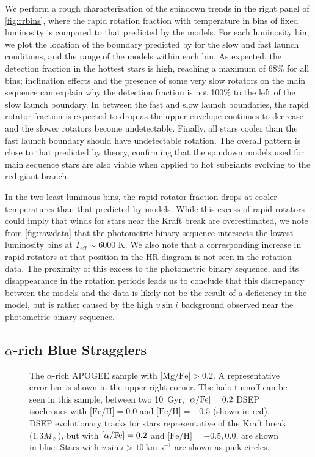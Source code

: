 \documentclass[preprint2]{aastex62}
\newcommand{\vsini}{\ensuremath{v \sin i}}
\newcommand{\Teff}{\ensuremath{T_{\textrm{eff}}}}
\newcommand{\kms}{\textrm{km~s}\ensuremath{^{-1}}}
\newcommand{\feh}{\textrm{[Fe/H]}}
\newcommand{\afe}{\textrm{[\ensuremath{\alpha}/Fe]}}
\newcommand{\mgfe}{\textrm{[Mg/Fe]}}
\begin{document}
We perform a rough characterization of the spindown trends in
the right panel of \cref{fig:rrbins}, where the rapid rotation fraction with
temperature in bins of fixed luminosity is compared to that predicted by the
\citet{vanSaders13} models. For each luminosity bin, we 
plot the location of the boundary predicted by \citet{vanSaders13} for the slow 
and fast launch conditions, and the range of the models within each bin. As
expected, the detection fraction in the hottest stars is high, reaching a
maximum of 68\% for all bins; inclination effects and the presence of some very
slow rotators on the main sequence can explain why the detection fraction is 
not 100\% to the left of the slow launch boundary. In between the fast and slow 
launch boundaries, the rapid rotator fraction is expected to drop as
the upper envelope continues to decrease and the slower rotators become 
undetectable. Finally, all stars cooler than the
fast launch boundary should have undetectable rotation. The overall pattern is
close to that predicted by theory, confirming that the spindown models used for
main sequence stars are also viable when applied to hot subgiants evolving to
the red giant branch.

In the two 
least luminous bins, the rapid rotator fraction drops at cooler temperatures 
than that predicted by models. While this excess of rapid rotators could imply that
winds for stars near the Kraft break are overestimated, we note from
\cref{fig:rawdata} that the photometric binary sequence intersects the lowest
luminosity bins at \(\Teff \sim 6000\) K. We also note that a corresponding
increase in rapid rotators at that position in the HR diagram is not seen in 
the \citet{McQuillan14} rotation
data. The proximity of this excess to the photometric binary sequence, and its
disappearance in the rotation periods leads us to conclude that this 
discrepancy between the models and the data is likely not be the result of a 
deficiency in the model, but is rather caused by the high \vsini{} background 
observed near the photometric binary sequence. 


\subsection{\(\alpha\)-rich Blue Stragglers}

\begin{figure}[htb]
    \centering
    \caption{The \(\alpha\)-rich APOGEE sample with \(\mgfe > 0.2\). A
        representative error bar is shown in the upper right corner. The halo
        turnoff can be seen in this sample, between two 10~Gyr, \(\afe = 0.2\) 
        DSEP isochrones with  \(\feh = 0.0\) and \(\feh=-0.5\) (shown in red). 
        DSEP evolutionary tracks for stars representative of the Kraft break 
        (\(1.3 M_\sun\)), but with \(\afe = 0.2\) and \(\feh = -0.5, 0.0\), are
        shown in blue. Stars with \(\vsini > 10~\kms\) are shown as pink 
    circles.} 
    \label{fig:highalpha}
\end{figure}
\end{document}
